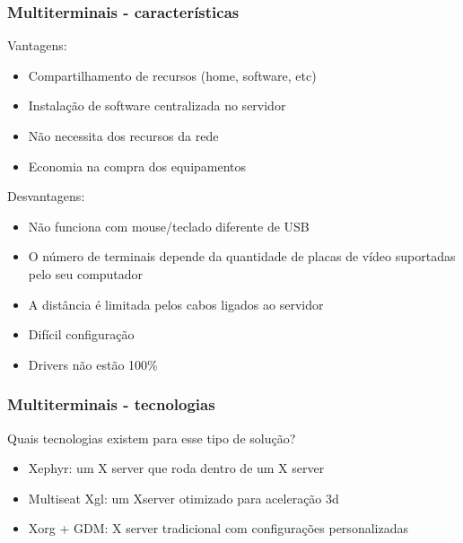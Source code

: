 \documentclass[utf8,9pt]{beamer}
\begin{document}
	  \begin{frame}
		  \frametitle{Multiterminais - características}
		  Vantagens:
		  \begin{itemize}
			  \item Compartilhamento de recursos (home, software, etc)
			  \item Instalação de software centralizada no servidor
			  \item Não necessita dos recursos da rede
			  \item Economia na compra dos equipamentos
		  \end{itemize}

		  Desvantagens:
		  \begin{itemize}
			  \item Não funciona com mouse/teclado diferente de USB
			  \item O número de terminais depende da quantidade de placas de vídeo suportadas pelo seu computador
			  \item A distância é limitada pelos cabos ligados ao servidor
			  \item Difícil configuração
			  \item Drivers não estão 100\%
		  \end{itemize}
	  \end{frame}

	  \begin{frame}
		  \frametitle{Multiterminais - tecnologias}
		  Quais tecnologias existem para esse tipo de solução?
		  \begin{itemize}
			  \item Xephyr: um X server que roda dentro de um X server
			  \item Multiseat Xgl: um Xserver otimizado para aceleração 3d
			  \item Xorg + GDM: X server tradicional com configurações personalizadas
		  \end{itemize}
	  \end{frame}
\end{document}
